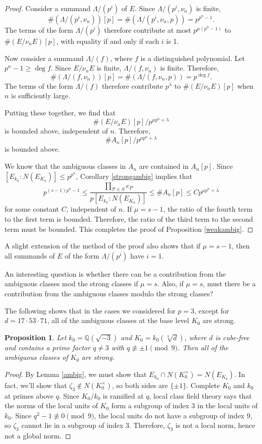 \documentclass{amsart}
\newtheorem{proposition}[theorem]{Proposition}
\begin{document}
\begin{proof}
Consider a summand $\Lambda/(p^i)$ of $E$. Since $\Lambda/(p^i, \nu_n)$ is finite,
$$
\#(\Lambda/(p^i, \nu_n))[p] = \#(\Lambda/(p^i, \nu_n,p)) = p^{p^n-1}.
$$
The terms of the form $\Lambda/(p^i)$ therefore contribute at most $p^{\mu (p^n-1)}$ to $\#(E/\nu_nE)[p]$, with equality
if and only if each $i$ is 1. 

Now consider a summand $\Lambda/(f)$, where $f$ is a distinguished polynomial. Let $p^n-1\ge \deg f$. Since
$E/\nu_nE$ is finite, $\Lambda/(f, \nu_n)$ is finite. Therefore,
$$
\#(\Lambda/(f, \nu_n))[p] = \#(\Lambda/(f, \nu_n, p))=p^{\deg f}.
$$
The terms of the form $\Lambda/(f)$ therefore contribute $p^{\lambda}$ to $\#(E/\nu_nE)[p]$ when $n$ is sufficiently large.

Putting these together, we find that
$$
\#(E/\nu_nE)[p]/p^{\mu p^n +\lambda}
$$
is bounded above, independent of $n$. 
Therefore,
$$
\#A_n[p]/p^{\mu p^n+\lambda}
$$
is bounded above.

We know that the ambiguous classes in $A_n$ are contained in $A_n[p]$.
Since $[E_{k_n} : N(E_{K_n})] \le p^{p^n}$, Corollary \ref{strongambig} implies that 
$$
p^{(s-1)p^n-1}\le \frac{\prod_{\mathcal P \in S} e_P}{p [E_{k_n}  : N(E_{K_n})]} \le \#A_n[p] \le Cp^{\mu p^n+\lambda}
$$
for some constant $C$, independent of $n$. If $\mu=s-1$, the ratio of the fourth term to the first term is bounded.
Therefore, the ratio of the third term to the second term must be bounded. This completes the proof
of Proposition \ref{weakambig}. \end{proof}

A slight extension of the method of the proof also shows that if $\mu=s-1$, then all summands of $E$ of the form $\Lambda/(p^i)$ have $i=1$. 

An interesting question is whether there can be a contribution from the ambiguous classes mod the strong classes if $\mu=s$.
Also, if $\mu=s$, must there be a contribution from the ambiguous classes modulo the strong classes?


The following shows that in the cases we considered for $p=3$, except for $d=17\cdot 53\cdot 71$, all of the ambiguous classes at the base level $K_0$
are strong. 

\begin{proposition}\label{allstrong3} Let $k_0=\mathbb Q(\sqrt{-3})$ and $K_0=k_0(\sqrt[3]{d})$, where $d$
is cube-free and contains a prime factor $q\ne 3$ with  $q\not\equiv \pm 1\pmod 9$. Then all of the ambiguous classes of $K_0$
are strong.
\end{proposition}
\begin{proof}  By Lemma \ref{ambig}, we must show that $E_{k_0}\cap N(K_0^{\times})=N(E_{K_0})$.
In fact, we'll show that $\zeta_3\not\in N(K_0^{\times})$, so both sides are $\{\pm 1\}$.
Complete $K_0$ and $k_0$ at primes above $q$.
Since $K_0/k_0$ is ramified at $q$, local class field theory says that the norms of the local units of $K_0$
form a subgroup of index 3 in the local units of $k_0$. Since $q^2- 1\not\equiv 0\pmod 9$, the local units
do not have a subgroup of index 9, so $\zeta_3$ cannot lie in a subgroup of index 3. Therefore, $\zeta_3$ is
not a local norm, hence not a global norm.\end{proof}
\end{document}
